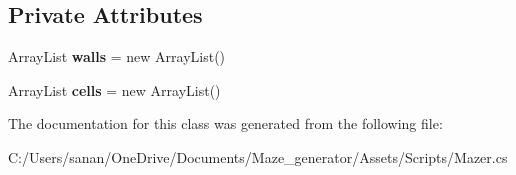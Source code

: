 \subsection*{Private Attributes}
\begin{DoxyCompactItemize}
\item 
\mbox{\label{class_mazer_a83dbadc098c4a5e44ff3ee81ef90e197}} 
Array\+List {\bfseries walls} = new Array\+List()
\item 
\mbox{\label{class_mazer_a0ae4071fb1a4413f938dd6428f71f4df}} 
Array\+List {\bfseries cells} = new Array\+List()
\end{DoxyCompactItemize}


The documentation for this class was generated from the following file\+:\begin{DoxyCompactItemize}
\item 
C\+:/\+Users/sanan/\+One\+Drive/\+Documents/\+Maze\+\_\+generator/\+Assets/\+Scripts/Mazer.\+cs\end{DoxyCompactItemize}
